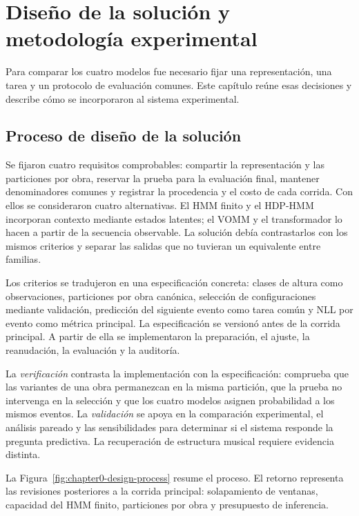 \chapter{Diseño de la solución y metodología experimental}
\label{chap:design}

Para comparar los cuatro modelos fue necesario fijar una representación, una tarea y un protocolo de evaluación comunes. Este capítulo reúne esas decisiones y describe cómo se incorporaron al sistema experimental.

\section{Proceso de diseño de la solución}
\label{sec:design-process}

Se fijaron cuatro requisitos comprobables: compartir la representación y las particiones por obra, reservar la prueba para la evaluación final, mantener denominadores comunes y registrar la procedencia y el costo de cada corrida. Con ellos se consideraron cuatro alternativas. El HMM finito y el HDP-HMM incorporan contexto mediante estados latentes; el VOMM y el transformador lo hacen a partir de la secuencia observable. La solución debía contrastarlos con los mismos criterios y separar las salidas que no tuvieran un equivalente entre familias.

Los criterios se tradujeron en una especificación concreta: clases de altura como observaciones, particiones por obra canónica, selección de configuraciones mediante validación, predicción del siguiente evento como tarea común y NLL por evento como métrica principal. La especificación se versionó antes de la corrida principal. A partir de ella se implementaron la preparación, el ajuste, la reanudación, la evaluación y la auditoría.

La \emph{verificación} contrasta la implementación con la especificación: comprueba que las variantes de una obra permanezcan en la misma partición, que la prueba no intervenga en la selección y que los cuatro modelos asignen probabilidad a los mismos eventos. La \emph{validación} se apoya en la comparación experimental, el análisis pareado y las sensibilidades para determinar si el sistema responde la pregunta predictiva. La recuperación de estructura musical requiere evidencia distinta.

La Figura~\ref{fig:chapter0-design-process} resume el proceso. El retorno representa las revisiones posteriores a la corrida principal: solapamiento de ventanas, capacidad del HMM finito, particiones por obra y presupuesto de inferencia.

